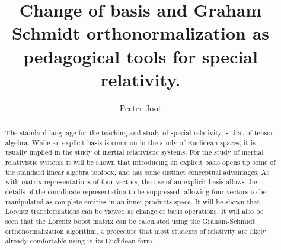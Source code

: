 \documentclass[iop,tighten]{emulateapj}
\begin{document}
\title{Change of basis and Graham Schmidt orthonormalization as pedagogical tools for special relativity.}

\author{
Peeter Joot 
}


\begin{abstract}

The standard language for the teaching and study of special relativity is that of tensor algebra.  
While an explicit basis is common in the study of Euclidean spaces, it is usually implied in the study of inertial relativistic systems.  
For the study of inertial relativistic systems it will be shown that introducing an explicit basis opens up some of the standard linear algebra toolbox, and has some distinct conceptual advantages.
As with matrix representations of four vectors, the use of an explicit basis allows the details of the coordinate representation to be suppressed, allowing four vectors to be manipulated as complete entities in an inner products space.
It will be shown that Lorentz transformations can be viewed as change of basis operations.  It will also be seen that the Lorentz boost matrix can be calculated using the Graham-Schmidt orthonormalization algorithm, a procedure that most students of relativity are likely already comfortable using in its Euclidean form.

\end{abstract}


%
%
%
%
%
%
%
%
%
%
%
\end{document}
